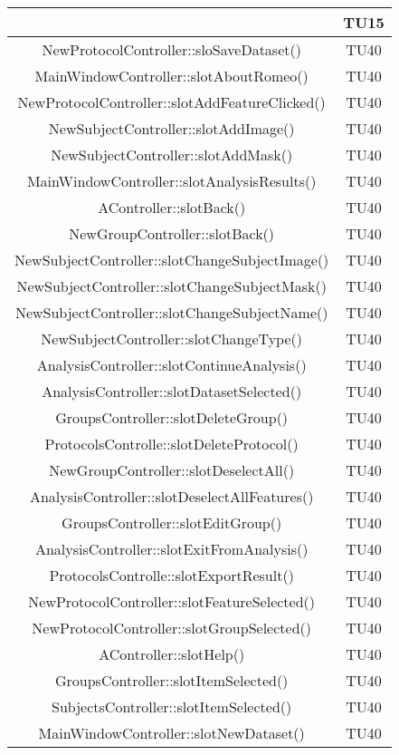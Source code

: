 \begin{center}
\begin{longtable}{|c|c|}
 & TU15 \\
\hline 
NewProtocolController::sloSaveDataset() & TU40 \\
\hline 
MainWindowController::slotAboutRomeo() & TU40 \\
\hline 
NewProtocolController::slotAddFeatureClicked() & TU40 \\
\hline 
NewSubjectController::slotAddImage() & TU40 \\
\hline 
NewSubjectController::slotAddMask() & TU40 \\
\hline 
MainWindowController::slotAnalysisResults() & TU40 \\
\hline 
AController::slotBack() & TU40 \\
\hline 
NewGroupController::slotBack() & TU40 \\
\hline 
NewSubjectController::slotChangeSubjectImage() & TU40 \\
\hline 
NewSubjectController::slotChangeSubjectMask() & TU40 \\
\hline 
NewSubjectController::slotChangeSubjectName() & TU40 \\
\hline 
NewSubjectController::slotChangeType() & TU40 \\
\hline 
AnalysisController::slotContinueAnalysis() & TU40 \\
\hline 
AnalysisController::slotDatasetSelected() & TU40 \\
\hline 
GroupsController::slotDeleteGroup() & TU40 \\
\hline 
ProtocolsControlle::slotDeleteProtocol() & TU40 \\
\hline 
NewGroupController::slotDeselectAll() & TU40 \\
\hline 
AnalysisController::slotDeselectAllFeatures() & TU40 \\
\hline 
GroupsController::slotEditGroup() & TU40 \\
\hline 
AnalysisController::slotExitFromAnalysis() & TU40 \\
\hline 
ProtocolsControlle::slotExportResult() & TU40 \\
\hline 
NewProtocolController::slotFeatureSelected() & TU40 \\
\hline 
NewProtocolController::slotGroupSelected() & TU40 \\
\hline 
AController::slotHelp() & TU40 \\
\hline 
GroupsController::slotItemSelected() & TU40 \\
\hline 
SubjectsController::slotItemSelected() & TU40 \\
\hline 
MainWindowController::slotNewDataset() & TU40 \\

\end{longtable}
\end{center}
